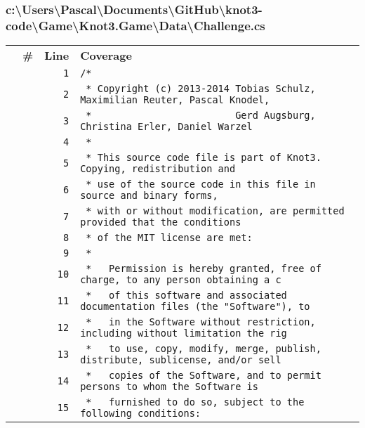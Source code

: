 \documentclass[a4paper,10pt]{article}
\begin{document}
\subsubsection{c:\textbackslash Users\textbackslash Pascal\textbackslash Documents\textbackslash GitHub\textbackslash knot3-code\textbackslash Game\textbackslash Knot3.Game\textbackslash Data\textbackslash Challenge.cs}
\begin{longtable}[l]{lrrl}
\textbf{} & \textbf{\#} & \textbf{Line} & \textbf{Coverage}\\
\cellcolor{gray} &  & \verb~1~ & \verb~/*~\\
\cellcolor{gray} &  & \verb~2~ & \verb~ * Copyright (c) 2013-2014 Tobias Schulz, Maximilian Reuter, Pascal Knodel,~\\
\cellcolor{gray} &  & \verb~3~ & \verb~ *                         Gerd Augsburg, Christina Erler, Daniel Warzel~\\
\cellcolor{gray} &  & \verb~4~ & \verb~ *~\\
\cellcolor{gray} &  & \verb~5~ & \verb~ * This source code file is part of Knot3. Copying, redistribution and~\\
\cellcolor{gray} &  & \verb~6~ & \verb~ * use of the source code in this file in source and binary forms,~\\
\cellcolor{gray} &  & \verb~7~ & \verb~ * with or without modification, are permitted provided that the conditions~\\
\cellcolor{gray} &  & \verb~8~ & \verb~ * of the MIT license are met:~\\
\cellcolor{gray} &  & \verb~9~ & \verb~ *~\\
\cellcolor{gray} &  & \verb~10~ & \verb~ *   Permission is hereby granted, free of charge, to any person obtaining a c~\\
\cellcolor{gray} &  & \verb~11~ & \verb~ *   of this software and associated documentation files (the "Software"), to ~\\
\cellcolor{gray} &  & \verb~12~ & \verb~ *   in the Software without restriction, including without limitation the rig~\\
\cellcolor{gray} &  & \verb~13~ & \verb~ *   to use, copy, modify, merge, publish, distribute, sublicense, and/or sell~\\
\cellcolor{gray} &  & \verb~14~ & \verb~ *   copies of the Software, and to permit persons to whom the Software is~\\
\cellcolor{gray} &  & \verb~15~ & \verb~ *   furnished to do so, subject to the following conditions:~\\

\end{longtable}
\end{document}
